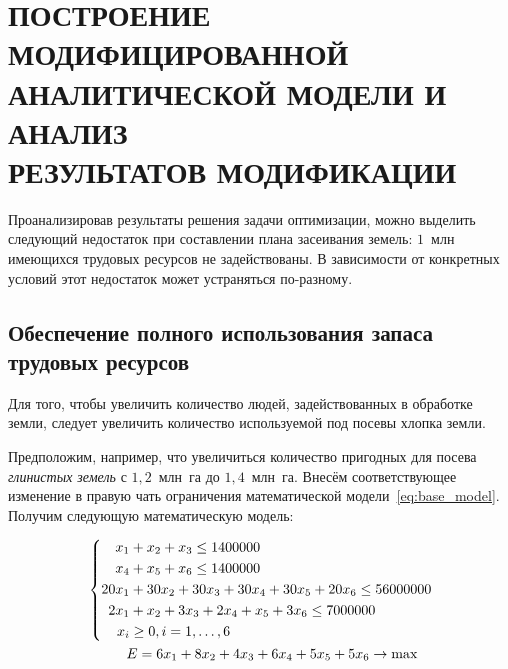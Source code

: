 \section[ПОСТРОЕНИЕ МОДИФИЦИРОВАННОЙ АНАЛИТИЧЕСКОЙ \\ МОДЕЛИ И АНАЛИЗ РЕЗУЛЬТАТОВ МОДИФИКАЦИИ]{ПОСТРОЕНИЕ МОДИФИЦИРОВАННОЙ \\ АНАЛИТИЧЕСКОЙ МОДЕЛИ И АНАЛИЗ \\ РЕЗУЛЬТАТОВ МОДИФИКАЦИИ}

Проанализировав результаты решения задачи оптимизации, можно выделить следующий недостаток при составлении плана засеивания земель: $ 1 $~млн имеющихся трудовых ресурсов не задействованы. В зависимости от конкретных условий этот недостаток может устраняться по-разному.

\subsection{Обеспечение полного использования запаса трудовых ресурсов}

Для того, чтобы увеличить количество людей, задействованных в обработке земли, следует увеличить количество используемой под посевы хлопка земли.

Предположим, например, что увеличиться количество пригодных для посева \textsl{глинистых земель} с $ 1,2 $~млн~га до $ 1,4 $~млн~га. Внесём соответствующее изменение в правую чать ограничения математической модели~\eqref{eq:base_model}. Получим следующую математическую модель:

\begin{equation}
  \label{eq:base_model_modif}
	\begin{aligned}
  	&\left\{
    	\begin{aligned}
	      x_1 & + x_2 + x_3 \le 1 400 000 \\
	      x_4 & + x_5 + x_6 \le 1 400 000 \\
	      20x_1 & + 30x_2 + 30x_3 + 30x_4 + 30x_5 + 20x_6 \le 56 000 000 \\
	      2x_1 & + x_2 + 3x_3 + 2x_4 + x_5 + 3x_6 \le 7 000 000 \\
	      x_i &\ge 0, i = 1, \ldots ,6  
    	\end{aligned}
  	\right.
  	\\
  	& \hspace{10mm} E = 6x_1 + 8x_2 + 4x_3 + 6x_4 + 5x_5 + 5x_6 \rightarrow \max
	\end{aligned}
\end{equation}

